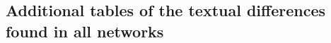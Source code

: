 
\begin{apendicesenv}
	\partapendices
	\chapter{Additional tables of the textual differences found in all networks}\label{ap:textd}




\end{apendicesenv}
